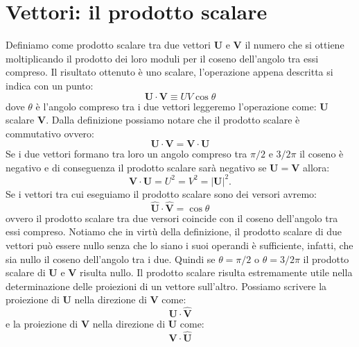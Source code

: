 \documentclass[a4paper,10pt,oneside]{article}
\begin{document}
\section*{Vettori: il prodotto scalare}

\vspace{1cm}

Definiamo come prodotto scalare tra due vettori $\mathbf{U}$ e $\mathbf{V}$ il numero che si ottiene moltiplicando il prodotto dei loro moduli per il coseno dell'angolo tra essi compreso. Il risultato ottenuto è uno scalare, l'operazione appena descritta si indica con un punto:
\begin{equation}
 \mathbf{U}\cdot\mathbf{V}\equiv UV\cos\theta
\end{equation}
dove $\theta$ è l'angolo compreso tra i due vettori leggeremo l'operazione come: $\mathbf{U}$ scalare $\mathbf{V}$. Dalla definizione possiamo notare che il prodotto scalare è commutativo ovvero:
\begin{equation}
 \mathbf{U}\cdot\mathbf{V}=\mathbf{V}\cdot\mathbf{U}
\end{equation}
Se i due vettori formano tra loro un angolo compreso tra $\pi/2$ e $3/2\pi$ il coseno è negativo e di conseguenza il prodotto scalare sarà negativo se $\mathbf{U}=\mathbf{V}$ allora:
\begin{equation}
 \mathbf{V}\cdot\mathbf{U}=U^2=V^2=|\mathbf{U}|^2.
\end{equation}
Se i vettori tra cui eseguiamo il prodotto scalare sono dei versori avremo:
\begin{equation}
 \hat{\mathbf{U}}\cdot \hat{\mathbf{V}}=\cos\theta
\end{equation}
ovvero il prodotto scalare tra due versori coincide con il coseno dell'angolo tra essi compreso.
Notiamo che in virtù della definizione, il prodotto scalare di due vettori può essere nullo senza che lo siano i suoi operandi è sufficiente, infatti, che sia nullo il coseno dell'angolo tra i due. Quindi se $\theta=\pi/2$ o $\theta=3/2\pi$ il prodotto scalare di $\mathbf{U}$ e $\mathbf{V}$ risulta nullo.
Il prodotto scalare risulta estremamente utile nella determinazione delle proiezioni di un vettore sull'altro. Possiamo scrivere la proiezione di $\mathbf{U}$ nella direzione di $\mathbf{V}$ come:
\begin{equation}
 \mathbf{U}\cdot\hat{\mathbf{V}}
\end{equation}
e la proiezione di $\mathbf{V}$ nella direzione di $\mathbf{U}$ come:
\begin{equation}
 \mathbf{V}\cdot\hat{\mathbf{U}}
\end{equation}
\end{document}
